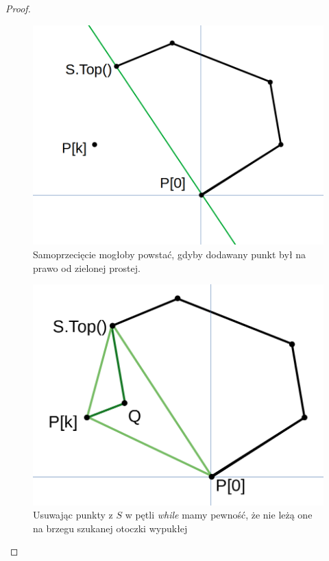 \begin{theorem}
\begin{proof}
\begin{enumerate}
\begin{itemize}
\begin{enumerate}
					\begin{minipage}{0.47\linewidth}
						\begin{figure}[H]
							\centering
							\includegraphics[width=\textwidth]{data/graham1.png}
							\caption{\small Samoprzecięcie mogłoby powstać, gdyby dodawany punkt był na prawo od zielonej prostej.}
							\label{fig:graham:samoprzeciecie}
						\end{figure}
					\end{minipage}
					\hfill
					\begin{minipage}{0.47\linewidth}
						\begin{figure}[H]
							\centering
							\includegraphics[width=\textwidth]{data/graham2.png}
							\caption{\small Usuwając punkty z $S$ w pętli \textit{while} mamy pewność, że nie leżą one na brzegu szukanej otoczki wypukłej}
							\label{fig:graham:usuwanie}
						\end{figure}
					\end{minipage}				


\end{enumerate}
\end{itemize}
\end{enumerate}
\end{proof}
\end{theorem}
